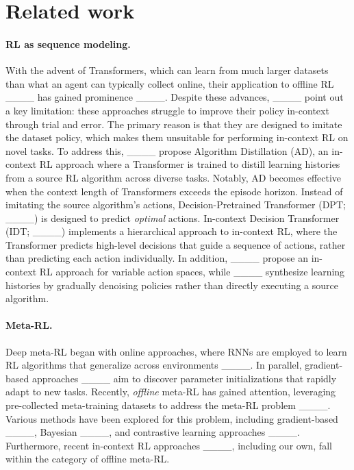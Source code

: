 \section{Related work}
\label{sec:rel}
\paragraph*{RL as sequence modeling.}
With the advent of Transformers, which can learn from much larger datasets than what an agent can typically collect online, their application to offline RL ____ has gained prominence ____.
Despite these advances, ____ point out a key limitation: these approaches struggle to improve their policy in-context through trial and error.
The primary reason is that they are designed to imitate the dataset policy, which makes them unsuitable for performing in-context RL on novel tasks.
To address this, ____ propose Algorithm Distillation (AD), an in-context RL approach where a Transformer is trained to distill learning histories from a source RL algorithm across diverse tasks.
Notably, AD becomes effective when the context length of Transformers exceeds the episode horizon.
Instead of imitating the source algorithm's actions, Decision-Pretrained Transformer (DPT; ____) is designed to predict \emph{optimal} actions.
In-context Decision Transformer (IDT; ____) implements a hierarchical approach to in-context RL, where the Transformer predicts high-level decisions that guide a sequence of actions, rather than predicting each action individually.
In addition, ____ propose an in-context RL approach for variable action spaces, while ____ synthesize learning histories by gradually denoising policies rather than directly executing a source algorithm.

\paragraph*{Meta-RL.}
Deep meta-RL began with online approaches, where RNNs are employed to learn RL algorithms that generalize across environments ____.
In parallel, gradient-based approaches ____ aim to discover parameter initializations that rapidly adapt to new tasks.
Recently, \emph{offline} meta-RL has gained attention, leveraging pre-collected meta-training datasets to address the meta-RL problem ____.
Various methods have been explored for this problem, including gradient-based ____, Bayesian ____, and contrastive learning approaches ____.
Furthermore, recent in-context RL approaches ____, including our own, fall within the category of offline meta-RL.

